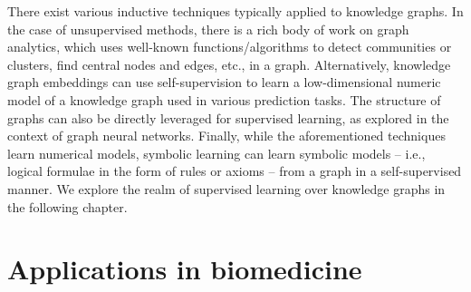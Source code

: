There exist various inductive techniques typically applied to knowledge graphs. In the case of unsupervised methods, there is a rich body of work on graph analytics, which uses well-known functions/algorithms to detect communities or clusters, find central nodes and edges, etc., in a graph. Alternatively, knowledge graph embeddings can use self-supervision to learn a low-dimensional numeric model of a knowledge graph used in various prediction tasks. The structure of graphs can also be directly leveraged for supervised learning, as explored in the context of graph neural networks. Finally, while the aforementioned techniques learn numerical models, symbolic learning can learn symbolic models – i.e., logical formulae in the form of rules or axioms – from a graph in a self-supervised manner. We explore the realm of supervised learning over knowledge graphs in the following chapter.


\section{Applications in biomedicine}\label{biomed}
